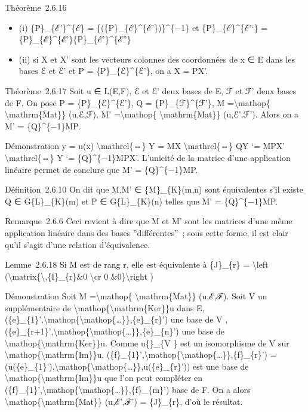 \documentclass[]{article}
\begin{document}
Théorème~2.6.16

\begin{itemize}
\itemsep1pt\parskip0pt
\item
  (i) \{P\}\_\{ℰ'\}\^{}\{ℰ\} = \{(\{P\}\_\{ℰ\}\^{}\{ℰ'\})\}\^{}\{−1\} et
  \{P\}\_\{ℰ\}\^{}\{ℰ'`\} =
  \{P\}\_\{ℰ\}\^{}\{ℰ'\}\{P\}\_\{ℰ'\}\^{}\{ℰ''\}
\item
  (ii) si X et X' sont les vecteurs colonnes des coordonnées de x ∈ E
  dans les bases ℰ et ℰ' et P = \{P\}\_\{ℰ\}\^{}\{ℰ'\}, on a X = PX'.
\end{itemize}

Théorème~2.6.17 Soit u ∈ L(E,F), ℰ et ℰ' deux bases de E, ℱ et ℱ' deux
bases de F. On pose P = \{P\}\_\{ℰ\}\^{}\{ℰ'\}, Q =
\{P\}\_\{ℱ\}\^{}\{ℱ'\}, M =\textbackslash{}mathop\{
\textbackslash{}mathrm\{Mat\}\} (u,ℰ,ℱ), M' =\textbackslash{}mathop\{
\textbackslash{}mathrm\{Mat\}\} (u,ℰ',ℱ'). Alors on a M' =
\{Q\}\^{}\{−1\}MP.

Démonstration y = u(x) \textbackslash{}mathrel\{⇔\} Y = MX
\textbackslash{}mathrel\{⇔\} QY `= MPX' \textbackslash{}mathrel\{⇔\} Y
`= \{Q\}\^{}\{−1\}MPX'. L'unicité de la matrice d'une application
linéaire permet de conclure que M' = \{Q\}\^{}\{−1\}MP.

Définition~2.6.10 On dit que M,M' ∈ \{M\}\_\{K\}(m,n) sont équivalentes
s'il existe Q ∈ G\{L\}\_\{K\}(m) et P ∈ G\{L\}\_\{K\}(n) telles que M' =
\{Q\}\^{}\{−1\}MP.

Remarque~2.6.6 Ceci revient à dire que M et M' sont les matrices d'une
même application linéaire dans des bases ''différentes''~; sous cette
forme, il est clair qu'il s'agit d'une relation d'équivalence.

Lemme~2.6.18 Si M est de rang r, elle est équivalente à \{J\}\_\{r\} =
\textbackslash{}left
(\textbackslash{}matrix\{\textbackslash{},\{I\}\_\{r\}\&0
\textbackslash{}cr 0 \&0\}\textbackslash{}right )

Démonstration Soit M =\textbackslash{}mathop\{
\textbackslash{}mathrm\{Mat\}\} (u,ℰ,ℱ). Soit V un supplémentaire de
\textbackslash{}mathop\{\textbackslash{}mathrm\{Ker\}\}u dans E,
(\{e\}\_\{1\}',\textbackslash{}mathop\{\textbackslash{}mathop\{\ldots{}\}\},\{e\}\_\{r\}')
une base de V ,
(\{e\}\_\{r+1\}',\textbackslash{}mathop\{\textbackslash{}mathop\{\ldots{}\}\},\{e\}\_\{n\}')
une base de \textbackslash{}mathop\{\textbackslash{}mathrm\{Ker\}\}u.
Comme u\{\textbar{}\}\_\{V \} est un isomorphisme de V sur
\textbackslash{}mathop\{\textbackslash{}mathrm\{Im\}\}u,
(\{f\}\_\{1\}',\textbackslash{}mathop\{\textbackslash{}mathop\{\ldots{}\}\},\{f\}\_\{r\}')
=
(u(\{e\}\_\{1\}'),\textbackslash{}mathop\{\textbackslash{}mathop\{\ldots{}\}\},u(\{e\}\_\{r\}'))
est une base de \textbackslash{}mathop\{\textbackslash{}mathrm\{Im\}\}u
que l'on peut compléter en
(\{f\}\_\{1\}',\textbackslash{}mathop\{\textbackslash{}mathop\{\ldots{}\}\},\{f\}\_\{m\}')
base de F. On a alors
\textbackslash{}mathop\{\textbackslash{}mathrm\{Mat\}\} (u,ℰ',ℱ') =
\{J\}\_\{r\}, d'où le résultat.
\end{document}
